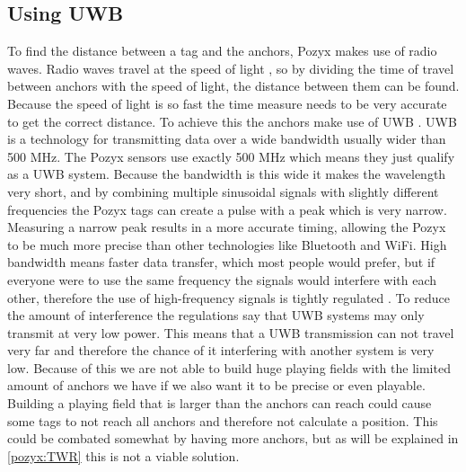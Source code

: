 \subsection{Using UWB}
To find the distance between a tag and the anchors, Pozyx makes use of radio waves.
Radio waves travel at the speed of light \cite{pozyx-UWB}, so by dividing the time of travel between anchors with the speed of light, the distance between them can be found.\\
Because the speed of light is so fast the time measure needs to be very accurate to get the correct distance.
To achieve this the anchors make use of UWB \cite{pozyx-UWB}.
UWB is a technology for transmitting data over a wide bandwidth usually wider than 500 MHz.
The Pozyx sensors use exactly 500 MHz which means they just qualify as a UWB system.
Because the bandwidth is this wide it makes the wavelength very short, and by combining multiple sinusoidal signals with slightly different frequencies the Pozyx tags can create a pulse with a peak which is very narrow.
Measuring a narrow peak results in a more accurate timing, allowing the Pozyx to be much more precise than other technologies like Bluetooth and WiFi.
High bandwidth means faster data transfer, which most people would prefer, but if everyone were to use the same frequency the signals would interfere with each other, therefore the use of high-frequency signals is tightly regulated \cite{tait-radio}.
To reduce the amount of interference the regulations say that UWB systems may only transmit at very low power.
This means that a UWB transmission can not travel very far and therefore the chance of it interfering with another system is very low.
Because of this we are not able to build huge playing fields with the limited amount of anchors we have if we also want it to be precise or even playable.
Building a playing field that is larger than the anchors can reach could cause some tags to not reach all anchors and therefore not calculate a position.
This could be combated somewhat by having more anchors, but as will be explained in \ref{pozyx:TWR} this is not a viable solution.


